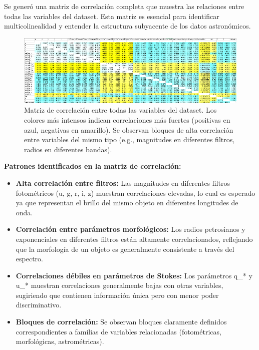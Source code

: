 \documentclass{article}
\begin{document}
Se generó una matriz de correlación completa que muestra las relaciones entre todas las variables del dataset. Esta matriz es esencial para identificar multicolinealidad y entender la estructura subyacente de los datos astronómicos.

\begin{figure}[H]
    \centering
    \includegraphics[width=1.0\linewidth]{correlacion_2.png}
    \caption{Matriz de correlación entre todas las variables del dataset. Los colores más intensos indican correlaciones más fuertes (positivas en azul, negativas en amarillo). Se observan bloques de alta correlación entre variables del mismo tipo (e.g., magnitudes en diferentes filtros, radios en diferentes bandas).}
    \label{fig:matriz_correlacion}
\end{figure}

\textbf{Patrones identificados en la matriz de correlación:}

\begin{itemize}
    \item \textbf{Alta correlación entre filtros:} Las magnitudes en diferentes filtros fotométricos (u, g, r, i, z) muestran correlaciones elevadas, lo cual es esperado ya que representan el brillo del mismo objeto en diferentes longitudes de onda.
    
    \item \textbf{Correlación entre parámetros morfológicos:} Los radios petrosianos y exponenciales en diferentes filtros están altamente correlacionados, reflejando que la morfología de un objeto es generalmente consistente a través del espectro.
    
    \item \textbf{Correlaciones débiles en parámetros de Stokes:} Los parámetros q\_* y u\_* muestran correlaciones generalmente bajas con otras variables, sugiriendo que contienen información única pero con menor poder discriminativo.
    
    \item \textbf{Bloques de correlación:} Se observan bloques claramente definidos correspondientes a familias de variables relacionadas (fotométricas, morfológicas, astrométricas).
\end{itemize}
\end{document}
